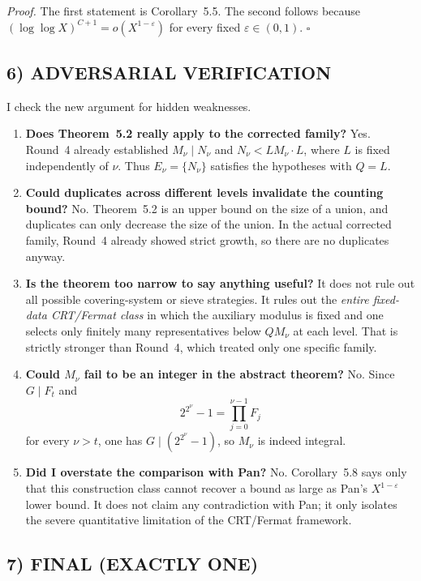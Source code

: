 \medskip
\noindent\emph{Proof.}
The first statement is Corollary~5.5.
The second follows because $(\log\log X)^{C+1}=o(X^{1-\varepsilon})$ for every fixed $\varepsilon\in(0,1)$. \hfill$\square$

\subsection*{6) ADVERSARIAL VERIFICATION}

I check the new argument for hidden weaknesses.

\begin{enumerate}
\item \textbf{Does Theorem~5.2 really apply to the corrected family?}
Yes.
Round~4 already established $M_\nu\mid N_\nu$ and $N_\nu<LM_\nu\cdot L$, where $L$ is fixed independently of $\nu$.
Thus $E_\nu=\{N_\nu\}$ satisfies the hypotheses with $Q=L$.

\item \textbf{Could duplicates across different levels invalidate the counting bound?}
No.
Theorem~5.2 is an upper bound on the size of a union, and duplicates can only decrease the size of the union.
In the actual corrected family, Round~4 already showed strict growth, so there are no duplicates anyway.

\item \textbf{Is the theorem too narrow to say anything useful?}
It does not rule out all possible covering-system or sieve strategies.
It rules out the \emph{entire fixed-data CRT/Fermat class} in which the auxiliary modulus is fixed and one selects only finitely many representatives below $QM_\nu$ at each level.
That is strictly stronger than Round~4, which treated only one specific family.

\item \textbf{Could $M_\nu$ fail to be an integer in the abstract theorem?}
No.
Since $G\mid F_t$ and
\[
2^{2^\nu}-1=\prod_{j=0}^{\nu-1}F_j
\]
for every $\nu>t$, one has $G\mid (2^{2^\nu}-1)$, so $M_\nu$ is indeed integral.

\item \textbf{Did I overstate the comparison with Pan?}
No.
Corollary~5.8 says only that this construction class cannot recover a bound as large as Pan's $X^{1-\varepsilon}$ lower bound.
It does not claim any contradiction with Pan; it only isolates the severe quantitative limitation of the CRT/Fermat framework.
\end{enumerate}

\subsection*{7) FINAL (EXACTLY ONE)}

